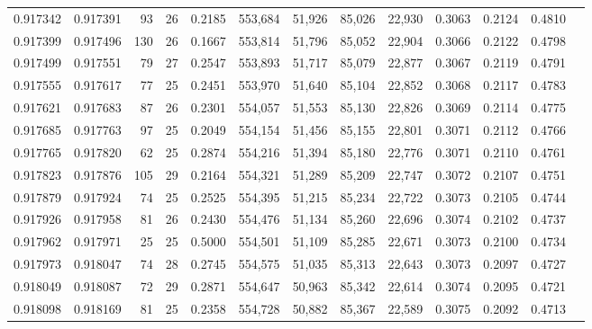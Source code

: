 \begin{tabular}{rrrrrrrrrrrrr}
0.917342 & 0.917391 &    93 &  26 &                                     0.2185 & 553,684 &  51,926 &  85,026 &  22,930 & 0.3063 & 0.2124 & 0.4810 \\
0.917399 & 0.917496 &   130 &  26 &                                     0.1667 & 553,814 &  51,796 &  85,052 &  22,904 & 0.3066 & 0.2122 & 0.4798 \\
0.917499 & 0.917551 &    79 &  27 &                                     0.2547 & 553,893 &  51,717 &  85,079 &  22,877 & 0.3067 & 0.2119 & 0.4791 \\
0.917555 & 0.917617 &    77 &  25 &                                     0.2451 & 553,970 &  51,640 &  85,104 &  22,852 & 0.3068 & 0.2117 & 0.4783 \\
0.917621 & 0.917683 &    87 &  26 &                                     0.2301 & 554,057 &  51,553 &  85,130 &  22,826 & 0.3069 & 0.2114 & 0.4775 \\
0.917685 & 0.917763 &    97 &  25 &                                     0.2049 & 554,154 &  51,456 &  85,155 &  22,801 & 0.3071 & 0.2112 & 0.4766 \\
0.917765 & 0.917820 &    62 &  25 &                                     0.2874 & 554,216 &  51,394 &  85,180 &  22,776 & 0.3071 & 0.2110 & 0.4761 \\
0.917823 & 0.917876 &   105 &  29 &                                     0.2164 & 554,321 &  51,289 &  85,209 &  22,747 & 0.3072 & 0.2107 & 0.4751 \\
0.917879 & 0.917924 &    74 &  25 &                                     0.2525 & 554,395 &  51,215 &  85,234 &  22,722 & 0.3073 & 0.2105 & 0.4744 \\
0.917926 & 0.917958 &    81 &  26 &                                     0.2430 & 554,476 &  51,134 &  85,260 &  22,696 & 0.3074 & 0.2102 & 0.4737 \\
0.917962 & 0.917971 &    25 &  25 &                                     0.5000 & 554,501 &  51,109 &  85,285 &  22,671 & 0.3073 & 0.2100 & 0.4734 \\
0.917973 & 0.918047 &    74 &  28 &                                     0.2745 & 554,575 &  51,035 &  85,313 &  22,643 & 0.3073 & 0.2097 & 0.4727 \\
0.918049 & 0.918087 &    72 &  29 &                                     0.2871 & 554,647 &  50,963 &  85,342 &  22,614 & 0.3074 & 0.2095 & 0.4721 \\
0.918098 & 0.918169 &    81 &  25 &                                     0.2358 & 554,728 &  50,882 &  85,367 &  22,589 & 0.3075 & 0.2092 & 0.4713 \\

\end{tabular}
